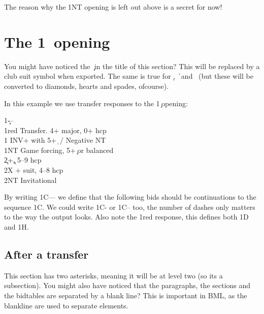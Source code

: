 \documentclass[a4paper]{article}
\begin{document}
The reason why the 1NT opening is left out above is a secret for
now!

\section{The 1\pdfc\ opening}

You might have noticed the \c\ in the title of this section? This
will be replaced by a club suit symbol when exported. The same is
true for \d , \h\ and \s\ (but these will be converted to diamonds,
hearts and spades, ofcourse).

In this example we use transfer responses to the 1\c\ opening:

\begin{bidtable}
1\c---\\
1red \> Transfer. 4+ major, 0+ hcp\\
1\s \> INV+ with 5+\d\ / Negative NT\\
1NT \> Game forcing, 5+\c\ or balanced\\
2\c {}+\c , 5--9 hcp\\
2X + suit, 4--8 hcp\\
2NT \> Invitational
\end{bidtable}

By writing 1C--- we define that the following bids should be
continuations to the sequence 1C. We could write 1C- or 1C-- too,
the number of dashes only matters to the way the output looks. Also
note the 1red response, this defines both 1D and 1H.

\subsection{After a transfer}

This section has two asterisks, meaning it will be at level two
(so its a subsection). You might also have noticed that the
paragraphs, the sections and the bidtables are separated by a
blank line? This is important in BML, as the blankline are used to
separate elements.
\end{document}
